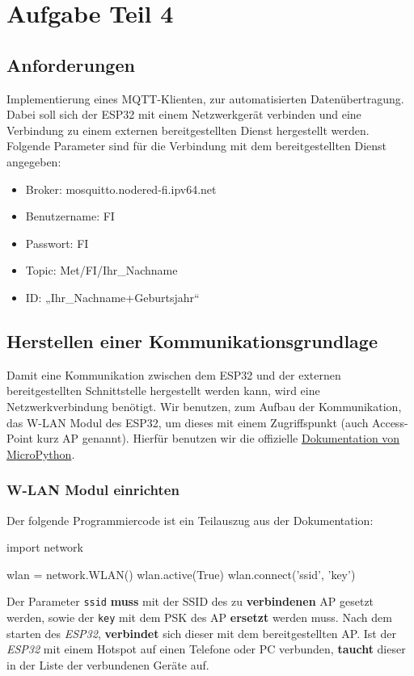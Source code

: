 \documentclass[18pt]{article}
\begin{document}
\newpage
\section{Aufgabe Teil 4}
\subsection{Anforderungen}
Implementierung eines MQTT-Klienten, zur automatisierten Datenübertragung. Dabei soll sich der ESP32 mit einem Netzwerkgerät verbinden und eine Verbindung zu einem externen bereitgestellten Dienst hergestellt werden.
Folgende Parameter sind für die Verbindung mit dem bereitgestellten Dienst angegeben:

\begin{itemize}
	\item Broker: mosquitto.nodered-fi.ipv64.net
	\item Benutzername: FI
	\item Passwort: FI
	\item Topic: Met/FI/Ihr\_Nachname
	\item ID: „Ihr\_Nachname+Geburtsjahr“
\end{itemize}

\subsection{Herstellen einer Kommunikationsgrundlage}
Damit eine Kommunikation zwischen dem ESP32 und der externen bereitgestellten Schnittstelle hergestellt werden kann, wird eine Netzwerkverbindung benötigt. Wir benutzen, zum Aufbau der Kommunikation, das W-LAN Modul des ESP32, um dieses mit einem Zugriffspunkt (auch Access-Point kurz AP genannt). Hierfür benutzen wir die offizielle \hyperref{https://docs.micropython.org/en/latest/esp32/quickref.html#wlan}{}{}{Dokumentation von MicroPython}.
\subsubsection{W-LAN Modul einrichten}
Der folgende Programmiercode ist ein Teilauszug aus der Dokumentation:
\begin{python}
import network
	
wlan = network.WLAN()
wlan.active(True)
wlan.connect('ssid', 'key')
\end{python}
Der Parameter \texttt{ssid} \textbf{muss} mit der SSID des zu \textbf{verbindenen} AP gesetzt werden, sowie der \texttt{key} mit dem PSK des AP \textbf{ersetzt} werden muss.
Nach dem starten des \textit{ESP32}, \textbf{verbindet} sich dieser mit dem bereitgestellten AP. Ist der \textit{ESP32} mit einem Hotspot auf einen Telefone oder PC verbunden, \textbf{taucht} dieser in der Liste der verbundenen Geräte auf.
\end{document}

